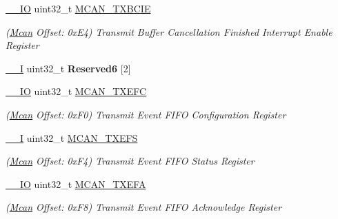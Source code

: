 \begin{DoxyCompactItemize}
\mbox{\hyperlink{core__cm7_8h_aec43007d9998a0a0e01faede4133d6be}{\+\_\+\+\_\+\+IO}} uint32\+\_\+t \mbox{\hyperlink{structMcan_a6960c238498346b677232d3a18add1a6}{M\+C\+A\+N\+\_\+\+T\+X\+B\+C\+IE}}
\begin{DoxyCompactList}\small\item\em (\mbox{\hyperlink{structMcan}{Mcan}} Offset\+: 0x\+E4) Transmit Buffer Cancellation Finished Interrupt Enable Register \end{DoxyCompactList}\item 
\mbox{\label{structMcan_a8ad32c922760409f64a7c50c1bef4a2f}} 
\mbox{\hyperlink{core__cm7_8h_af63697ed9952cc71e1225efe205f6cd3}{\+\_\+\+\_\+I}} uint32\+\_\+t {\bfseries Reserved6} \mbox{[}2\mbox{]}
\item 
\mbox{\label{structMcan_a0f52d48de177c0f3e8c06497e8b3a568}} 
\mbox{\hyperlink{core__cm7_8h_aec43007d9998a0a0e01faede4133d6be}{\+\_\+\+\_\+\+IO}} uint32\+\_\+t \mbox{\hyperlink{structMcan_a0f52d48de177c0f3e8c06497e8b3a568}{M\+C\+A\+N\+\_\+\+T\+X\+E\+FC}}
\begin{DoxyCompactList}\small\item\em (\mbox{\hyperlink{structMcan}{Mcan}} Offset\+: 0x\+F0) Transmit Event F\+I\+FO Configuration Register \end{DoxyCompactList}\item 
\mbox{\label{structMcan_a4c880b0d7a88d8d8385597c533ed4650}} 
\mbox{\hyperlink{core__cm7_8h_af63697ed9952cc71e1225efe205f6cd3}{\+\_\+\+\_\+I}} uint32\+\_\+t \mbox{\hyperlink{structMcan_a4c880b0d7a88d8d8385597c533ed4650}{M\+C\+A\+N\+\_\+\+T\+X\+E\+FS}}
\begin{DoxyCompactList}\small\item\em (\mbox{\hyperlink{structMcan}{Mcan}} Offset\+: 0x\+F4) Transmit Event F\+I\+FO Status Register \end{DoxyCompactList}\item 
\mbox{\label{structMcan_acbbe6e566676e3205330ef4abddcde45}} 
\mbox{\hyperlink{core__cm7_8h_aec43007d9998a0a0e01faede4133d6be}{\+\_\+\+\_\+\+IO}} uint32\+\_\+t \mbox{\hyperlink{structMcan_acbbe6e566676e3205330ef4abddcde45}{M\+C\+A\+N\+\_\+\+T\+X\+E\+FA}}
\begin{DoxyCompactList}\small\item\em (\mbox{\hyperlink{structMcan}{Mcan}} Offset\+: 0x\+F8) Transmit Event F\+I\+FO Acknowledge Register \end{DoxyCompactList}\item 

\end{DoxyCompactItemize}
